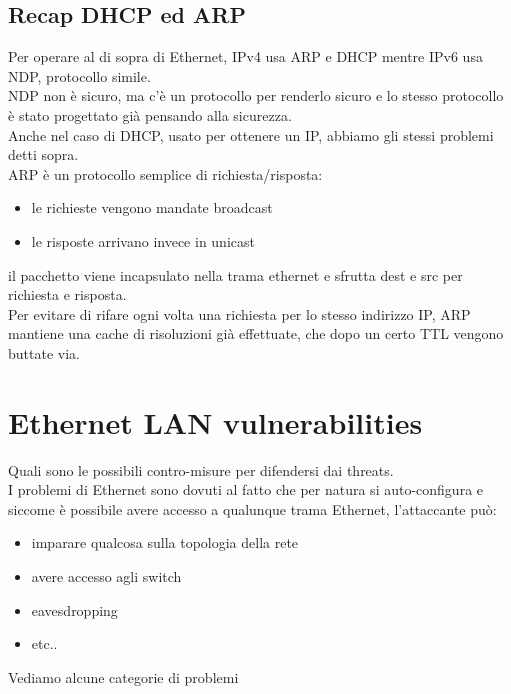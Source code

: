 \documentclass[12pt, oneside]{extbook} %
\begin{document}
\subsection{Recap DHCP ed ARP}
Per operare al di sopra di Ethernet, IPv4 usa ARP e DHCP mentre IPv6 usa NDP, protocollo simile.
\\NDP non è sicuro, ma c'è un protocollo per renderlo sicuro e lo stesso protocollo è stato progettato già pensando alla sicurezza.
\\Anche nel caso di DHCP, usato per ottenere un IP, abbiamo gli stessi problemi detti sopra.\\
ARP è un protocollo semplice di richiesta/risposta:
\begin{itemize}
    \item le richieste vengono mandate broadcast
    \item le risposte arrivano invece in unicast
\end{itemize}
il pacchetto viene incapsulato nella trama ethernet e sfrutta dest e src per richiesta e risposta.
\\Per evitare di rifare ogni volta una richiesta per lo stesso indirizzo IP, ARP mantiene una cache di risoluzioni già effettuate, che dopo un certo TTL vengono buttate via.

\section{Ethernet LAN vulnerabilities}
Quali sono le possibili contro-misure per difendersi dai threats.
\\I problemi di Ethernet sono dovuti al fatto che per natura si auto-configura e siccome è possibile avere accesso a qualunque trama Ethernet, l'attaccante può:
\begin{itemize}
    \item imparare qualcosa sulla topologia della rete
    \item avere accesso agli switch
    \item eavesdropping
    \item etc..
\end{itemize}

Vediamo alcune categorie di problemi
\end{document}
